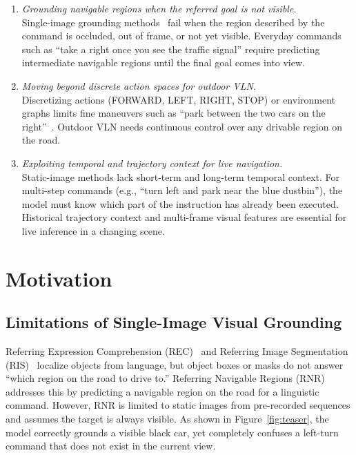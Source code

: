 \begin{enumerate}\label{enum:problems-addressed-by-thesis}
    \item[\textbf{A}] \textit{Grounding navigable regions when the referred goal is not visible.} \\
    Single-image grounding methods~\cite{Rufus_2021,hu2016segmentation,rohrbach2016grounding} fail when the region described by the command is occluded, out of frame, or not yet visible. Everyday commands such as ``take a right once you see the traffic signal'' require predicting intermediate navigable regions until the final goal comes into view.

    \item[\textbf{B}] \textit{Moving beyond discrete action spaces for outdoor VLN.} \\
    Discretizing actions (FORWARD, LEFT, RIGHT, STOP) or environment graphs limits fine maneuvers such as ``park between the two cars on the right''~\cite{Chen2019TOUCHDOWN,zhu-etal-2021-multimodal}. Outdoor VLN needs continuous control over any drivable region on the road.

    \item[\textbf{C}] \textit{Exploiting temporal and trajectory context for live navigation.} \\
    Static-image methods lack short-term and long-term temporal context. For multi-step commands (e.g., ``turn left and park near the blue dustbin''), the model must know which part of the instruction has already been executed. Historical trajectory context and multi-frame visual features are essential for live inference in a changing scene.
\end{enumerate}

\section{Motivation}

\subsection{Limitations of Single-Image Visual Grounding}

Referring Expression Comprehension (REC)~\cite{rohrbach2016grounding,hu2016natural} and Referring Image Segmentation (RIS)~\cite{hu2016segmentation} localize objects from language, but object boxes or masks do not answer ``which region on the road to drive to.'' Referring Navigable Regions (RNR)~\cite{Rufus_2021} addresses this by predicting a navigable region on the road for a linguistic command. However, RNR is limited to static images from pre-recorded sequences and assumes the target is always visible. As shown in Figure~\ref{fig:teaser}, the model correctly grounds a visible black car, yet completely confuses a left-turn command that does not exist in the current view.

